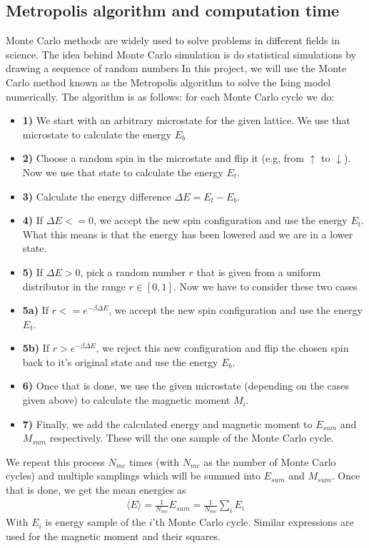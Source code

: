 \documentclass[12pt]{article}
\begin{document}
\subsection{Metropolis algorithm and computation time}
Monte Carlo methods are widely used to solve problems in different fields in science. The idea behind Monte Carlo simulation is do statistical simulations by drawing a sequence of random numbers In this project, we will use the Monte Carlo method known as the Metropolis algorithm to solve the Ising model numerically.
The algorithm is as follows: for each Monte Carlo cycle we do:
\begin{itemize}
\item \textbf{1)} We start with an arbitrary microstate for the given lattice. We use that microstate to calculate the energy $E_b$
\item \textbf{2)} Choose a random spin in the microstate and flip it (e.g, from $\uparrow$ to $\downarrow$). Now we use that state to calculate the energy $E_t$.
\item \textbf{3)} Calculate the energy difference $\Delta E = E_t - E_b$. 
\item \textbf{4)} If $\Delta E <= 0$, we accept the new spin configuration and use the energy $E_t$. What this means is that the energy has been lowered and we are in a lower state.
\item \textbf{5)} If $ \Delta E > 0$, pick a random number $r$ that is given from a uniform distributor in the range $r \in [0,1]$. Now we have to consider these two cases
\item \textbf{5a)} If $r <= e^{-\beta \Delta E}$, we accept the new spin configuration and use the energy $E_t$.
\item \textbf{5b)} If $ r > e^{-\beta \Delta E}$, we reject this new configuration and flip the chosen spin back to it's original state and use the energy $E_b$.
\item \textbf{6)} Once that is done, we use the given microstate (depending on the cases given above) to calculate the magnetic moment $M_i$.
\item \textbf{7)} Finally, we add the calculated energy and magnetic moment to $E_{sum}$ and $M_{sum}$ respectively. These will the one sample of the Monte Carlo cycle.
\end{itemize}
We repeat this process $N_{mc}$ times (with $N_{mc}$ as the number of Monte Carlo cycles) and multiple samplings which will be summed into $E_{sum}$ and $M_{sum}$. Once that is done, we get the mean energies as
\begin{align*}
\langle E \rangle = \frac{1}{N_{mc}}E_{sum} = \frac{1}{N_{mc}}\displaystyle \sum_i E_i
\end{align*}
With $E_i$ is energy sample of the $i$'th Monte Carlo cycle. Similar expressions are used for the magnetic moment and their squares.
\end{document}
